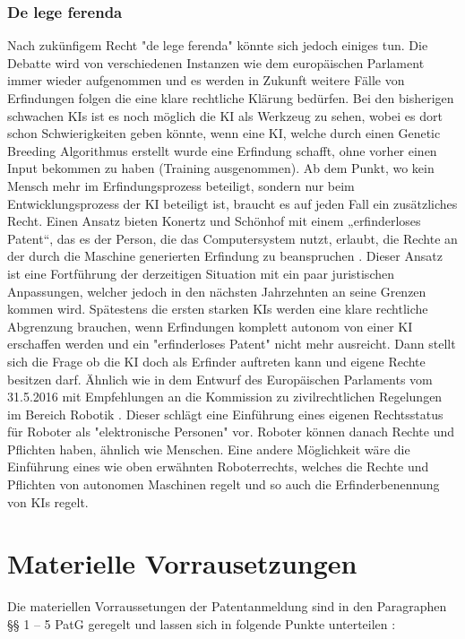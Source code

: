 \subsubsection{De lege ferenda}
Nach zukünfigem Recht "de lege ferenda" könnte sich jedoch einiges tun.
Die Debatte wird von verschiedenen 
Instanzen wie dem europäischen Parlament immer wieder aufgenommen und es 
werden in Zukunft weitere Fälle von Erfindungen folgen die eine klare rechtliche 
Klärung bedürfen. 
Bei den bisherigen schwachen KIs ist es noch möglich die KI als Werkzeug
zu sehen, wobei es dort schon Schwierigkeiten geben könnte, wenn eine KI,
welche durch einen Genetic Breeding Algorithmus erstellt wurde eine Erfindung
schafft, ohne vorher einen Input bekommen zu haben (Training ausgenommen).
Ab dem Punkt, wo kein Mensch mehr im Erfindungsprozess beteiligt,
sondern nur beim Entwicklungsprozess der KI beteiligt ist,
braucht es auf jeden Fall ein zusätzliches Recht.
Einen Ansatz bieten Konertz und Schönhof mit einem 
„erfinderloses Patent“, das es der Person, 
die das Computersystem nutzt, erlaubt, 
die Rechte an der durch die Maschine generierten Erfindung zu beanspruchen
\cite{konertzErfindungenDurchComputer2018}. 
Dieser Ansatz ist eine Fortführung der derzeitigen Situation mit ein paar
juristischen Anpassungen, welcher jedoch in den nächsten Jahrzehnten 
an seine Grenzen kommen wird.
Spätestens die ersten starken KIs werden eine klare rechtliche Abgrenzung 
brauchen, 
wenn Erfindungen komplett autonom 
von einer KI erschaffen werden und ein "erfinderloses Patent" 
nicht mehr ausreicht.
Dann stellt sich die Frage ob die KI doch als Erfinder auftreten kann 
und eigene Rechte besitzen darf. Ähnlich wie in dem Entwurf des Europäischen
Parlaments vom 31.5.2016 mit
Empfehlungen an die Kommission zu zivilrechtlichen Regelungen im
Bereich Robotik \cite{delvauxMitEmpfehlungenKommission}. 
Dieser schlägt 
eine Einführung eines eigenen Rechtsstatus 
für Roboter als "elektronische Personen" vor.
Roboter können danach Rechte und Pflichten haben, 
ähnlich wie Menschen.
Eine andere Möglichkeit wäre die Einführung eines wie oben 
erwähnten Roboterrechts, welches die Rechte und Pflichten von
autonomen Maschinen regelt und so auch die Erfinderbenennung
von KIs regelt.
\\

\section{Materielle Vorrausetzungen}

Die materiellen Vorraussetungen der Patentanmeldung sind 
in den Paragraphen §§ 1 – 5 PatG geregelt 
und lassen sich in folgende Punkte unterteilen :


